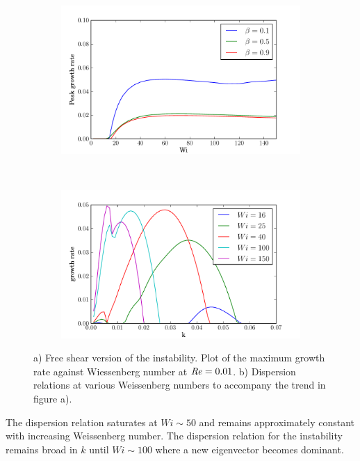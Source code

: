 \documentclass{jfm}
\newcommand\Rey{\mbox{\textit{Re}}}  %
\begin{document}
\begin{figure}
    \centering
    \begin{subfigure}[b]{0.48\textwidth}
	\centering
	\includegraphics[width=\textwidth]{inf_purely_elastic}
	\caption{}
	\label{fig:inf_low_Re}
    \end{subfigure}
    ~
    \begin{subfigure}[b]{0.48\textwidth}
	\centering
	\includegraphics[width=\textwidth]{inf_dispersions_low_Re}
	\caption{}
	\label{fig:dispersions_low_Re}
    \end{subfigure}
    \caption{a) Free shear version of the instability. Plot of the maximum growth rate against Wiessenberg number at $\Rey = 0.01$. b) Dispersion relations at various Weissenberg numbers to accompany the trend in figure a).}
\end{figure}

The dispersion relation saturates at $Wi \sim 50$ and remains approximately constant with increasing Weissenberg number. The dispersion relation for the instability remains broad in $k$ until $Wi \sim 100$ where a new eigenvector becomes dominant.
\end{document}
